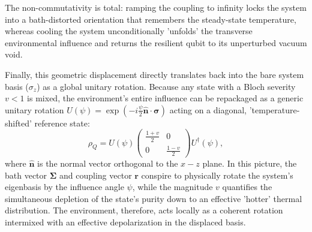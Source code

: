 The non-commutativity is total: ramping the coupling to infinity locks the system into a bath-distorted orientation that remembers the steady-state temperature, whereas cooling the system unconditionally 'unfolds' the transverse environmental influence and returns the resilient qubit to its unperturbed vacuum void.

Finally, this geometric displacement directly translates back into the bare system basis ($\sigma_z$) as a global unitary rotation. Because any state with a Bloch severity $v < 1$ is mixed, the environment's entire influence can be repackaged as a generic unitary rotation $U(\psi) = \exp(-i \frac{\psi}{2} \hat{\boldsymbol{n}} \cdot \boldsymbol{\sigma})$ acting on a diagonal, 'temperature-shifted' reference state:
\begin{equation}
    \rho_Q = U(\psi) \begin{pmatrix} \frac{1+v}{2} & 0 \\ 0 & \frac{1-v}{2} \end{pmatrix} U^\dagger(\psi), 
\end{equation}
where $\hat{\boldsymbol{n}}$ is the normal vector orthogonal to the $x-z$ plane. In this picture, the bath vector $\boldsymbol{\Sigma}$ and coupling vector $\boldsymbol{r}$ conspire to physically rotate the system's eigenbasis by the influence angle $\psi$, while the magnitude $v$ quantifies the simultaneous depletion of the state's purity down to an effective 'hotter' thermal distribution. The environment, therefore, acts locally as a coherent rotation intermixed with an effective depolarization in the displaced basis.
